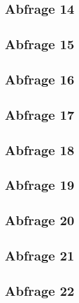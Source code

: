 \subsection{Abfrage 14}

\subsection{Abfrage 15}

\subsection{Abfrage 16}

\subsection{Abfrage 17}

\subsection{Abfrage 18}

\subsection{Abfrage 19}

\subsection{Abfrage 20}

\subsection{Abfrage 21}

\subsection{Abfrage 22}



